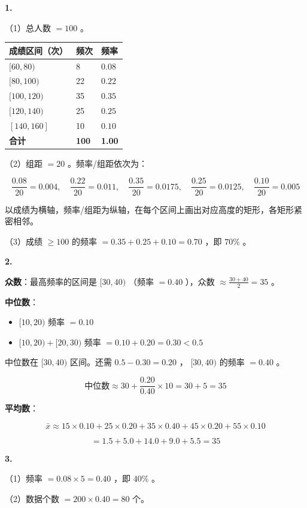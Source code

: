 \begin{answer}


\textbf{1.}

（1）总人数 $= 100$ 。

\begin{center}
\begin{tabular}{lll}
\toprule
成绩区间（次） & 频次 & 频率 \\
\midrule
$[60, 80)$ & 8 & $0.08$ \\
$[80, 100)$ & 22 & $0.22$ \\
$[100, 120)$ & 35 & $0.35$ \\
$[120, 140)$ & 25 & $0.25$ \\
$[140, 160]$ & 10 & $0.10$ \\
\textbf{合计} & \textbf{100} & \textbf{1.00} \\
\bottomrule
\end{tabular}
\end{center}


（2）组距 $= 20$ 。频率/组距依次为：

\[
\frac{0.08}{20} = 0.004, \quad \frac{0.22}{20} = 0.011, \quad \frac{0.35}{20} = 0.0175, \quad \frac{0.25}{20} = 0.0125, \quad \frac{0.10}{20} = 0.005
\]


以成绩为横轴，频率/组距为纵轴，在每个区间上画出对应高度的矩形，各矩形紧密相邻。

（3）成绩 $\geq 100$ 的频率 $= 0.35 + 0.25 + 0.10 = 0.70$ ，即 $70\%$ 。

\textbf{2.}

\textbf{众数}：最高频率的区间是 $[30, 40)$ （频率 $= 0.40$ ），众数 $\approx \frac{30+40}{2} = 35$ 。

\textbf{中位数}：
\begin{itemize}
  \item $[10, 20)$ 频率 $= 0.10$
  \item $[10, 20) + [20, 30)$ 频率 $= 0.10 + 0.20 = 0.30 < 0.5$
\end{itemize}


中位数在 $[30, 40)$ 区间。还需 $0.5 - 0.30 = 0.20$ ， $[30, 40)$ 的频率 $= 0.40$ 。

\[
\text{中位数} \approx 30 + \frac{0.20}{0.40} \times 10 = 30 + 5 = 35
\]


\textbf{平均数}：

\[
\bar{x} \approx 15 \times 0.10 + 25 \times 0.20 + 35 \times 0.40 + 45 \times 0.20 + 55 \times 0.10
\]


\[
= 1.5 + 5.0 + 14.0 + 9.0 + 5.5 = 35
\]


\textbf{3.}

（1）频率 $= 0.08 \times 5 = 0.40$ ，即 $40\%$ 。

（2）数据个数 $= 200 \times 0.40 = 80$ 个。

\end{answer}
